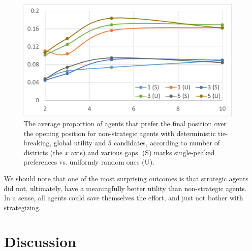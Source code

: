 \documentclass[letterpaper]{article} %
\begin{document}
\vspace{-0.87mm}
\vspace{-1.74mm}
\vspace{-2.61mm}
\begin{figure}
\centering
\includegraphics[width=\columnwidth]{by_gap_by_sp_rev_stats_agent_util_imp_v_53_tb_True_st_False_gr_True_can_5_N_1000_new.pdf}
\caption{The average proportion of agents that prefer the final position over the opening position
for non-strategic agents with deterministic tie-breaking, global utility and 5 candidates, according to number of districts (the $x$ axis) and various gaps. (S) marks single-peaked preferences vs. uniformly random ones (U).}
\label{fig:SPGlob}
\end{figure}

We should note that one of the most surprising outcomes is that strategic agents did not, ultimately, have a meaningfully better utility than non-strategic agents. In a sense, all agents could save themselves the effort, and just not bother with strategizing.

\vspace{-0.85mm}
\vspace{-2.45mm}
\section{Discussion}
\end{document}
